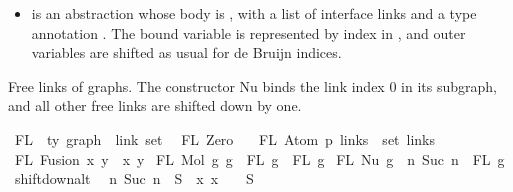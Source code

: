 \begin{isabellebody}
\begin{isamarkuptext}
\begin{itemize}
\begin{itemize}
\item {} is an abstraction whose body is , with a list
of interface links  and a type annotation .  The bound
variable is represented by index  in , and outer variables
are shifted as usual for de Bruijn indices.%
\end{itemize}%
\end{itemize}%
\end{isamarkuptext}\isamarkuptrue%
%
\begin{isamarkuptext}%
Free links of graphs.
The constructor Nu binds the link index 0 in its subgraph,
and all other free links are shifted down by one.%
\end{isamarkuptext}\isamarkuptrue%
\isamarkupfalse%
\ FL\ {\isacharcolon}{\kern0pt}{\isacharcolon}{\kern0pt}\ {\isachardoublequoteopen}{\isacharprime}{\kern0pt}ty\ graph\ {\isacharequal}{\kern0pt}{\isachargreater}{\kern0pt}\ link\ set{\isachardoublequoteclose}\isanewline
{}\isanewline
\ \ {\isachardoublequoteopen}FL\ Zero\ {\isacharequal}{\kern0pt}\ {\isacharbraceleft}{\kern0pt}{\isacharbraceright}{\kern0pt}{\isachardoublequoteclose}\isanewline
{\isacharbar}{\kern0pt}\ {\isachardoublequoteopen}FL\ {\isacharparenleft}{\kern0pt}Atom\ p\ links{\isacharparenright}{\kern0pt}\ {\isacharequal}{\kern0pt}\ set\ links{\isachardoublequoteclose}\isanewline
{\isacharbar}{\kern0pt}\ {\isachardoublequoteopen}FL\ {\isacharparenleft}{\kern0pt}Fusion\ x\ y{\isacharparenright}{\kern0pt}\ {\isacharequal}{\kern0pt}\ {\isacharbraceleft}{\kern0pt}x{\isacharcomma}{\kern0pt}\ y{\isacharbraceright}{\kern0pt}{\isachardoublequoteclose}\isanewline
{\isacharbar}{\kern0pt}\ {\isachardoublequoteopen}FL\ {\isacharparenleft}{\kern0pt}Mol\ g{}\ g{}{\isacharparenright}{\kern0pt}\ {\isacharequal}{\kern0pt}\ FL\ g{}\ {\isasymunion}\ FL\ g{}{\isachardoublequoteclose}\isanewline
{\isacharbar}{\kern0pt}\ {\isachardoublequoteopen}FL\ {\isacharparenleft}{\kern0pt}Nu\ g{\isacharparenright}{\kern0pt}\ {\isacharequal}{\kern0pt}\ {\isacharbraceleft}{\kern0pt}n{\isachardot}{\kern0pt}\ Suc\ n\ {\isasymin}\ FL\ g{\isacharbraceright}{\kern0pt}{\isachardoublequoteclose}\isanewline
\isanewline
\isanewline
{}\isamarkupfalse%
\ shift{\isacharunderscore}{\kern0pt}down{\isacharunderscore}{\kern0pt}alt{\isacharcolon}{\kern0pt}\isanewline
\ \ {\isachardoublequoteopen}{\isacharbraceleft}{\kern0pt}n{\isachardot}{\kern0pt}\ Suc\ n\ {\isasymin}\ S{\isacharbraceright}{\kern0pt}\ {\isacharequal}{\kern0pt}\ {\isacharparenleft}{\kern0pt}{\isasymlambda}x{\isachardot}{\kern0pt}\ x\ {\isacharminus}{\kern0pt}\ {}{\isacharparenright}{\kern0pt}\ {\isacharbackquote}{\kern0pt}\ {\isacharparenleft}{\kern0pt}S\ {\isacharminus}{\kern0pt}\ {\isacharbraceleft}{\kern0pt}{}{\isacharbraceright}{\kern0pt}{\isacharparenright}{\kern0pt}{\isachardoublequoteclose}\isanewline

\end{isabellebody}

